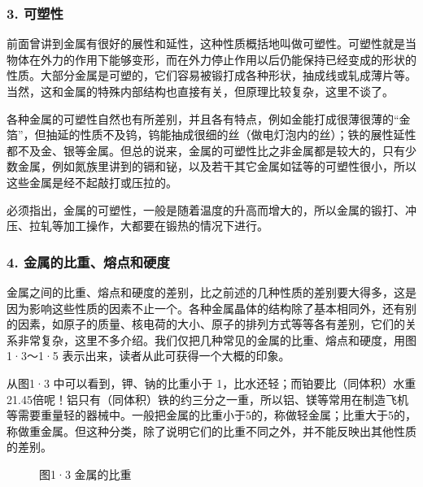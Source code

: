 \subsubsection{3. 可塑性}

前面曾讲到金属有很好的展性和延性，这种性质概括地叫做可塑性。可塑性就是当物体在外力的作用下能够变形，而在外力停止作用以后仍能保持已经变成的形状的性质。大部分金属是可塑的，它们容易被锻打成各种形状，抽成线或轧成薄片等。当然，这和金属的特殊内部结构也直接有关，但原理比较复杂，这里不谈了。

各种金属的可塑性自然也有所差别，并且各有特点，例如金能打成很薄很薄的``金箔''，但抽延的性质不及钨，钨能抽成很细的丝（做电灯泡内的丝）；铁的展性延性都不及金、银等金属。但总的说来，金属的可塑性比之非金属都是较大的，只有少数金属，例如氮族里讲到的镉和铋，以及若干其它金属如锰等的可塑性很小，所以这些金属是经不起敲打或压拉的。

必须指出，金属的可塑性，一般是随着温度的升高而增大的，所以金属的锻打、冲压、拉轧等加工操作，大都要在锻热的情况下进行。

\subsubsection{4. 金属的比重、熔点和硬度}

金属之间的比重、熔点和硬度的差别，比之前述的几种性质的差别要大得多，这是因为影响这些性质的因素不止一个。各种金属晶体的结构除了基本相同外，还有别的因素，如原子的质量、核电荷的大小、原子的排列方式等等各有差别，它们的关系非常复杂，这里不多介绍。我们仅把几种常见的金属的比重、熔点和硬度，用图1·3～1·5 表示出来，读者从此可获得一个大概的印象。

从图1·3 中可以看到，钾、钠的比重小于
1，比水还轻；而铂要比（同体积）水重21.45倍呢！铝只有（同体积）铁的约三分之一重，所以铝、镁等常用在制造飞机等需要重量轻的器械中。一般把金属的比重小于5的，称做轻金属；比重大于5的，称做重金属。但这种分类，除了说明它们的比重不同之外，并不能反映出其他性质的差别。

\begin{figure}
\centering
{}
\caption{图1·3 金属的比重}
\end{figure}

